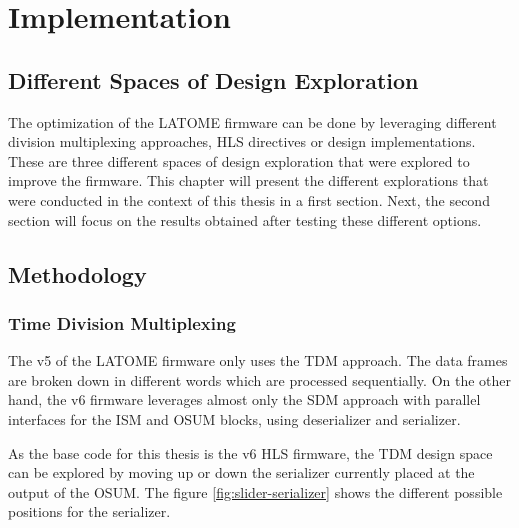 \chapter{Implementation}\label{ch:implementation}

\section{Different Spaces of Design Exploration}

The optimization of the LATOME firmware can be done by leveraging different division multiplexing approaches, HLS directives or design implementations. These are three different spaces of design exploration that were explored to improve the firmware. This chapter will present the different explorations that were conducted in the context of this thesis in a first section. Next, the second section will focus on the results obtained after testing these different options.


\section{Methodology}

\subsection{Time Division Multiplexing}

The v5 of the LATOME firmware only uses the TDM approach. The data frames are broken down in different words which are processed sequentially. On the other hand, the v6 firmware leverages almost only the SDM approach with parallel interfaces for the ISM and OSUM blocks, using deserializer and serializer.

As the base code for this thesis is the v6 HLS firmware, the TDM design space can be explored by moving up or down the serializer currently placed at the output of the OSUM. The figure \ref{fig:slider-serializer} shows the different possible positions for the serializer. 

